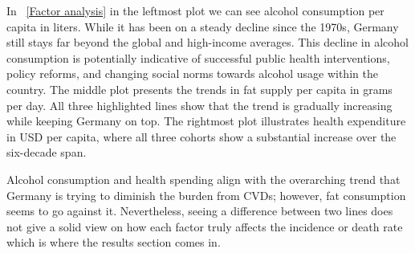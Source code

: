 In \figurename~\ref{Factor analysis} in the leftmost plot we can see alcohol consumption per capita in liters. While it has been on a steady decline since the 1970s, Germany still stays far beyond the global and high-income averages. This decline in alcohol consumption is potentially indicative of successful public health interventions, policy reforms, and changing social norms towards alcohol usage within the country. The middle plot presents the trends in fat supply per capita in grams per day. All three highlighted lines show that the trend is gradually increasing while keeping Germany on top. The rightmost plot illustrates health expenditure in USD per capita, where all three cohorts show a substantial increase over the six-decade span.

Alcohol consumption and health spending align with the overarching trend that Germany is trying to diminish the burden from CVDs; however, fat consumption seems to go against it. Nevertheless, seeing a difference between two lines does not give a solid view on how each factor truly affects the incidence or death rate which is where the results section comes in.